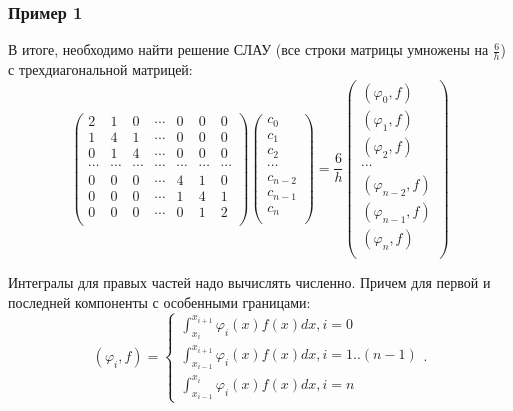 \documentclass[10pt]{beamer}
\begin{document}
\begin{frame}[fragile]
\frametitle{Пример 1}
В итоге, необходимо найти решение СЛАУ (все строки матрицы умножены на $\frac{6}{h}$) с трехдиагональной матрицей:
\begin{equation}
\begin{pmatrix}
2 & 1 & 0 & \cdots & 0 & 0 & 0 \\
1 & 4 & 1 & \cdots & 0 & 0 & 0 \\
0 & 1 & 4 & \cdots & 0 & 0 & 0 \\
\cdots & \cdots & \cdots & \cdots & \cdots & \cdots & \cdots\\
0 & 0 & 0 & \cdots & 4 & 1 & 0\\
0 & 0 & 0 & \cdots & 1 & 4 & 1\\
0 & 0 & 0 & \cdots & 0 & 1 & 2\\
\end{pmatrix}
\begin{pmatrix}
c_0 \\
c_1 \\
c_2 \\
\cdots \\
c_{n-2} \\
c_{n-1} \\
c_{n} \\
\end{pmatrix}
=
\frac{6}{h} 
\begin{pmatrix}
(\varphi_0, f) \\
(\varphi_1, f) \\
(\varphi_2, f) \\
\cdots \\
(\varphi_{n-2}, f) \\
(\varphi_{n-1}, f) \\
(\varphi_n, f) \\
\end{pmatrix}
\end{equation}

Интегралы для правых частей надо вычислять численно. Причем для первой и последней компоненты с особенными границами:
$$(\varphi_i, f) = 
\begin{cases}
\int_{x_{i}}^{x_{i+1}} \varphi_i(x) f(x) dx, i = 0\\
\int_{x_{i-1}}^{x_{i+1}} \varphi_i(x) f(x) dx, i = 1 .. (n-1)\\
\int_{x_{i-1}}^{x_{i}} \varphi_i(x) f(x) dx, i = n
\end{cases}
.$$
\end{frame}
\end{document}
